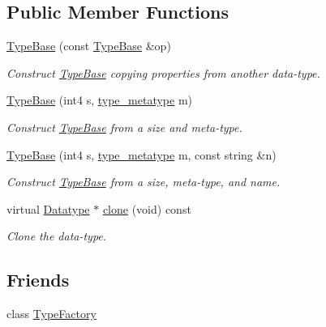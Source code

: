 \subsection*{Public Member Functions}
\begin{DoxyCompactItemize}
\item 
\mbox{\hyperlink{class_type_base_acb68fe0901b43e35623b6373495c1d6f}{Type\+Base}} (const \mbox{\hyperlink{class_type_base}{Type\+Base}} \&op)
\begin{DoxyCompactList}\small\item\em Construct \mbox{\hyperlink{class_type_base}{Type\+Base}} copying properties from another data-\/type. \end{DoxyCompactList}\item 
\mbox{\hyperlink{class_type_base_abb8a8ebca133d6410978e0b53f453d8c}{Type\+Base}} (int4 s, \mbox{\hyperlink{type_8hh_aef6429f2523cdf4d415ba04a0209e61f}{type\+\_\+metatype}} m)
\begin{DoxyCompactList}\small\item\em Construct \mbox{\hyperlink{class_type_base}{Type\+Base}} from a size and meta-\/type. \end{DoxyCompactList}\item 
\mbox{\hyperlink{class_type_base_aa722eb1d566302bedbfe08ba372b7e3c}{Type\+Base}} (int4 s, \mbox{\hyperlink{type_8hh_aef6429f2523cdf4d415ba04a0209e61f}{type\+\_\+metatype}} m, const string \&n)
\begin{DoxyCompactList}\small\item\em Construct \mbox{\hyperlink{class_type_base}{Type\+Base}} from a size, meta-\/type, and name. \end{DoxyCompactList}\item 
virtual \mbox{\hyperlink{class_datatype}{Datatype}} $\ast$ \mbox{\hyperlink{class_type_base_ad506116cf9bf5bc6d13654b38609d184}{clone}} (void) const
\begin{DoxyCompactList}\small\item\em Clone the data-\/type. \end{DoxyCompactList}\end{DoxyCompactItemize}
\subsection*{Friends}
\begin{DoxyCompactItemize}
\item 
class \mbox{\hyperlink{class_type_base_ac8c1945d0a63785e78b3e09a13226ed6}{Type\+Factory}}
\end{DoxyCompactItemize}
